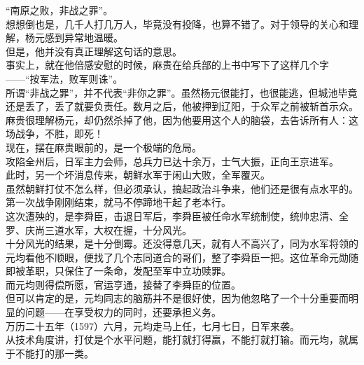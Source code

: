 \begin{multicols}{\theparacolNo}
“南原之败，非战之罪”。\\

想想倒也是，几千人打几万人，毕竟没有投降，也算不错了。对于领导的关心和理解，杨元感到异常地温暖。\\

但是，他并没有真正理解这句话的意思。\\

事实上，就在他倍感安慰的时候，麻贵在给兵部的上书中写下了这样几个字——“按军法，败军则诛”。\\

所谓“非战之罪”，并不代表“非你之罪”。虽然杨元很能打，也很能逃，但城池毕竟还是丢了，丢了就要负责任。数月之后，他被押到辽阳，于众军之前被斩首示众。\\

麻贵很理解杨元，却仍然杀掉了他，因为他要用这个人的脑袋，去告诉所有人：这场战争，不胜，即死！\\

现在，摆在麻贵眼前的，是一个极端的危局。\\

攻陷全州后，日军主力会师，总兵力已达十余万，士气大振，正向王京进军。\\

此时，另一个坏消息传来，朝鲜水军于闲山大败，全军覆灭。\\

虽然朝鲜打仗不怎么样，但必须承认，搞起政治斗争来，他们还是很有点水平的。第一次战争刚刚结束，就马不停蹄地干起了老本行。\\

这次遭殃的，是李舜臣，击退日军后，李舜臣被任命水军统制使，统帅忠清、全罗、庆尚三道水军，大权在握，十分风光。\\

十分风光的结果，是十分倒霉。还没得意几天，就有人不高兴了，同为水军将领的元均看他不顺眼，便找了几个志同道合的哥们，整了李舜臣一把。这位革命元勋随即被革职，只保住了一条命，发配至军中立功赎罪。\\

而元均则得偿所愿，官运亨通，接替了李舜臣的位置。\\

但可以肯定的是，元均同志的脑筋并不是很好使，因为他忽略了一个十分重要而明显的问题——在享受权力的同时，还要承担义务。\\

万历二十五年（1597）六月，元均走马上任，七月七日，日军来袭。\\

从技术角度讲，打仗是个水平问题，能打就打得赢，不能打就打输。而元均，就属于不能打的那一类。\\


\end{multicols}
